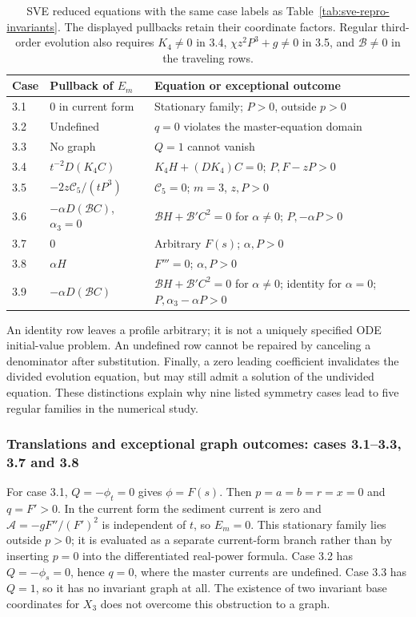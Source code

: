 \begin{table}[htbp]
\centering\small
\begin{tabularx}{\linewidth}{@{}p{.85cm}p{4.6cm}X@{}}
\toprule
Case & Pullback of $E_m$ & Equation or exceptional outcome\\
\midrule
3.1 & $0$ in current form & Stationary family; $P>0$, outside $p>0$\\
3.2 & Undefined & $q=0$ violates the master-equation domain\\
3.3 & No graph & $Q=1$ cannot vanish\\
3.4 & $t^{-2}D(K_4C)$ & $K_4H+(DK_4)C=0$; $P,F-zP>0$\\
3.5 & $-2z\mathcal C_5/(tP^3)$ & $\mathcal C_5=0$; $m=3$, $z,P>0$\\
3.6 & $-\alpha D(\mathcal B C)$, $\alpha_3=0$ & $\mathcal B H+\mathcal B'C^2=0$ for $\alpha\ne0$; $P,-\alpha P>0$\\
3.7 & $0$ & Arbitrary $F(s)$; $\alpha,P>0$\\
3.8 & $\alpha H$ & $F'''=0$; $\alpha,P>0$\\
3.9 & $-\alpha D(\mathcal B C)$ & $\mathcal B H+\mathcal B'C^2=0$ for $\alpha\ne0$; identity for $\alpha=0$; $P,\alpha_3-\alpha P>0$\\
\bottomrule
\end{tabularx}
\caption{SVE reduced equations with the same case labels as
Table~\ref{tab:sve-repro-invariants}. The displayed pullbacks retain their
coordinate factors. Regular third-order evolution also requires
$K_4\ne0$ in 3.4, $\chi z^2P^3+g\ne0$ in 3.5, and
$\mathcal B\ne0$ in the traveling rows.}
\label{tab:sve-reduced-equations}
\end{table}

An identity row leaves a profile arbitrary; it is not a uniquely specified
ODE initial-value problem. An undefined row cannot be repaired by canceling
a denominator after substitution. Finally, a zero leading coefficient
invalidates the divided evolution equation, but may still admit a solution
of the undivided equation. These distinctions explain why nine listed
symmetry cases lead to five regular families in the numerical study.

\subsubsection{Translations and exceptional graph outcomes: cases 3.1--3.3, 3.7 and 3.8}
For case 3.1, $Q=-\phi_t=0$ gives $\phi=F(s)$. Then
$p=a=b=r=x=0$ and $q=F'>0$. In the current form the sediment
current is zero and $\mathcal A=-gF''/(F')^2$ is independent of $t$,
so $E_m=0$. This stationary family lies outside $p>0$; it is evaluated
as a separate current-form branch rather than by inserting $p=0$
into the differentiated real-power formula.
Case 3.2 has $Q=-\phi_s=0$, hence $q=0$, where the master currents
are undefined. Case 3.3 has $Q=1$, so it has no invariant graph at all.
The existence of two invariant base coordinates for $X_3$ does not
overcome this obstruction to a graph.

